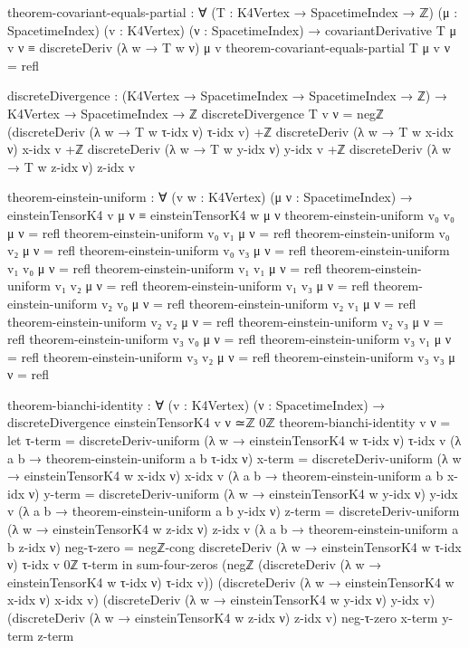 \documentclass[11pt,a4paper]{book}
\begin{document}
\begin{code}
theorem-covariant-equals-partial : ∀ (T : K4Vertex → SpacetimeIndex → ℤ)
                                     (μ : SpacetimeIndex) (v : K4Vertex) (ν : SpacetimeIndex) →
  covariantDerivative T μ v ν ≡ discreteDeriv (λ w → T w ν) μ v
theorem-covariant-equals-partial T μ v ν = refl

discreteDivergence : (K4Vertex → SpacetimeIndex → SpacetimeIndex → ℤ) → 
                      K4Vertex → SpacetimeIndex → ℤ
discreteDivergence T v ν = 
  negℤ (discreteDeriv (λ w → T w τ-idx ν) τ-idx v) +ℤ
  discreteDeriv (λ w → T w x-idx ν) x-idx v +ℤ
  discreteDeriv (λ w → T w y-idx ν) y-idx v +ℤ
  discreteDeriv (λ w → T w z-idx ν) z-idx v

theorem-einstein-uniform : ∀ (v w : K4Vertex) (μ ν : SpacetimeIndex) →
  einsteinTensorK4 v μ ν ≡ einsteinTensorK4 w μ ν
theorem-einstein-uniform v₀ v₀ μ ν = refl
theorem-einstein-uniform v₀ v₁ μ ν = refl
theorem-einstein-uniform v₀ v₂ μ ν = refl
theorem-einstein-uniform v₀ v₃ μ ν = refl
theorem-einstein-uniform v₁ v₀ μ ν = refl
theorem-einstein-uniform v₁ v₁ μ ν = refl
theorem-einstein-uniform v₁ v₂ μ ν = refl
theorem-einstein-uniform v₁ v₃ μ ν = refl
theorem-einstein-uniform v₂ v₀ μ ν = refl
theorem-einstein-uniform v₂ v₁ μ ν = refl
theorem-einstein-uniform v₂ v₂ μ ν = refl
theorem-einstein-uniform v₂ v₃ μ ν = refl
theorem-einstein-uniform v₃ v₀ μ ν = refl
theorem-einstein-uniform v₃ v₁ μ ν = refl
theorem-einstein-uniform v₃ v₂ μ ν = refl
theorem-einstein-uniform v₃ v₃ μ ν = refl

theorem-bianchi-identity : ∀ (v : K4Vertex) (ν : SpacetimeIndex) →
  discreteDivergence einsteinTensorK4 v ν ≃ℤ 0ℤ
theorem-bianchi-identity v ν = 
  let
      τ-term = discreteDeriv-uniform (λ w → einsteinTensorK4 w τ-idx ν) τ-idx v 
                 (λ a b → theorem-einstein-uniform a b τ-idx ν)
      x-term = discreteDeriv-uniform (λ w → einsteinTensorK4 w x-idx ν) x-idx v 
                 (λ a b → theorem-einstein-uniform a b x-idx ν)
      y-term = discreteDeriv-uniform (λ w → einsteinTensorK4 w y-idx ν) y-idx v 
                 (λ a b → theorem-einstein-uniform a b y-idx ν)
      z-term = discreteDeriv-uniform (λ w → einsteinTensorK4 w z-idx ν) z-idx v 
                 (λ a b → theorem-einstein-uniform a b z-idx ν)
      neg-τ-zero = negℤ-cong {discreteDeriv (λ w → einsteinTensorK4 w τ-idx ν) τ-idx v} {0ℤ} τ-term
  in sum-four-zeros (negℤ (discreteDeriv (λ w → einsteinTensorK4 w τ-idx ν) τ-idx v))
                    (discreteDeriv (λ w → einsteinTensorK4 w x-idx ν) x-idx v)
                    (discreteDeriv (λ w → einsteinTensorK4 w y-idx ν) y-idx v)
                    (discreteDeriv (λ w → einsteinTensorK4 w z-idx ν) z-idx v)
                    neg-τ-zero x-term y-term z-term


\end{code}
\end{document}

